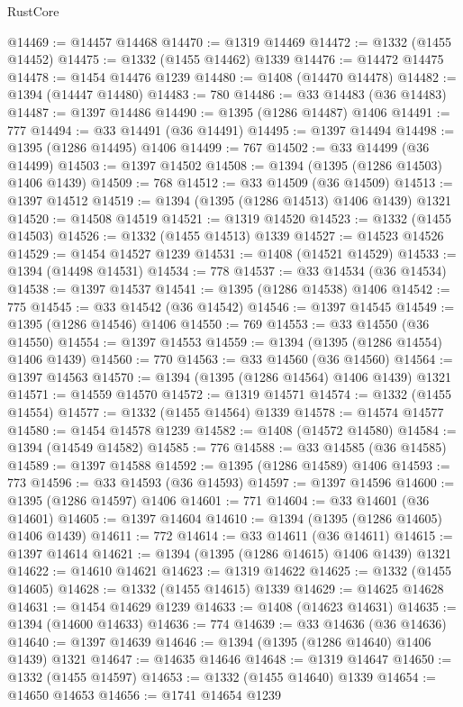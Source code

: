 \begin{lexlean}{RustCore}
\begin{coremodule}
@14469 := @14457 @14468
@14470 := @1319 @14469
@14472 := @1332 (@1455 @14452)
@14475 := @1332 (@1455 @14462) @1339
@14476 := @14472 @14475
@14478 := @1454 @14476 @1239
@14480 := @1408 (@14470 @14478)
@14482 := @1394 (@14447 @14480)
@14483 := 780
@14486 := @33 @14483 (@36 @14483)
@14487 := @1397 @14486
@14490 := @1395 (@1286 @14487) @1406
@14491 := 777
@14494 := @33 @14491 (@36 @14491)
@14495 := @1397 @14494
@14498 := @1395 (@1286 @14495) @1406
@14499 := 767
@14502 := @33 @14499 (@36 @14499)
@14503 := @1397 @14502
@14508 := @1394 (@1395 (@1286 @14503) @1406 @1439)
@14509 := 768
@14512 := @33 @14509 (@36 @14509)
@14513 := @1397 @14512
@14519 := @1394 (@1395 (@1286 @14513) @1406 @1439) @1321
@14520 := @14508 @14519
@14521 := @1319 @14520
@14523 := @1332 (@1455 @14503)
@14526 := @1332 (@1455 @14513) @1339
@14527 := @14523 @14526
@14529 := @1454 @14527 @1239
@14531 := @1408 (@14521 @14529)
@14533 := @1394 (@14498 @14531)
@14534 := 778
@14537 := @33 @14534 (@36 @14534)
@14538 := @1397 @14537
@14541 := @1395 (@1286 @14538) @1406
@14542 := 775
@14545 := @33 @14542 (@36 @14542)
@14546 := @1397 @14545
@14549 := @1395 (@1286 @14546) @1406
@14550 := 769
@14553 := @33 @14550 (@36 @14550)
@14554 := @1397 @14553
@14559 := @1394 (@1395 (@1286 @14554) @1406 @1439)
@14560 := 770
@14563 := @33 @14560 (@36 @14560)
@14564 := @1397 @14563
@14570 := @1394 (@1395 (@1286 @14564) @1406 @1439) @1321
@14571 := @14559 @14570
@14572 := @1319 @14571
@14574 := @1332 (@1455 @14554)
@14577 := @1332 (@1455 @14564) @1339
@14578 := @14574 @14577
@14580 := @1454 @14578 @1239
@14582 := @1408 (@14572 @14580)
@14584 := @1394 (@14549 @14582)
@14585 := 776
@14588 := @33 @14585 (@36 @14585)
@14589 := @1397 @14588
@14592 := @1395 (@1286 @14589) @1406
@14593 := 773
@14596 := @33 @14593 (@36 @14593)
@14597 := @1397 @14596
@14600 := @1395 (@1286 @14597) @1406
@14601 := 771
@14604 := @33 @14601 (@36 @14601)
@14605 := @1397 @14604
@14610 := @1394 (@1395 (@1286 @14605) @1406 @1439)
@14611 := 772
@14614 := @33 @14611 (@36 @14611)
@14615 := @1397 @14614
@14621 := @1394 (@1395 (@1286 @14615) @1406 @1439) @1321
@14622 := @14610 @14621
@14623 := @1319 @14622
@14625 := @1332 (@1455 @14605)
@14628 := @1332 (@1455 @14615) @1339
@14629 := @14625 @14628
@14631 := @1454 @14629 @1239
@14633 := @1408 (@14623 @14631)
@14635 := @1394 (@14600 @14633)
@14636 := 774
@14639 := @33 @14636 (@36 @14636)
@14640 := @1397 @14639
@14646 := @1394 (@1395 (@1286 @14640) @1406 @1439) @1321
@14647 := @14635 @14646
@14648 := @1319 @14647
@14650 := @1332 (@1455 @14597)
@14653 := @1332 (@1455 @14640) @1339
@14654 := @14650 @14653
@14656 := @1741 @14654 @1239

\end{coremodule}
\end{lexlean}

